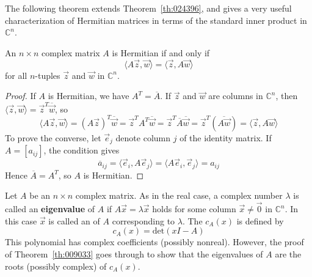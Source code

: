 \documentclass{ximera}
\begin{document}
The following theorem extends Theorem~\ref{th:024396}, and gives a very useful characterization of Hermitian matrices in terms of the standard inner product in $\mathbb{C}^n$.


\begin{theorem}\label{th:025697}
An $n \times n$ complex matrix $A$ is Hermitian if and only if
\begin{equation*}
\langle A\vec{z}, \vec{w} \rangle = \langle \vec{z}, A\vec{w} \rangle
\end{equation*}
for all $n$-tuples $\vec{z}$ and $\vec{w}$ in $\mathbb{C}^n$.
\end{theorem}

\begin{proof}
If $A$ is Hermitian, we have $A^T = \overline{A}$. If $\vec{z}$ and $\vec{w}$ are columns in $\mathbb{C}^n$, then $\langle \vec{z}, \vec{w} \rangle = \vec{z}^T\overline{\vec{w}}$, so
\begin{equation*}
\langle A\vec{z}, \vec{w} \rangle =(A\vec{z})^T\overline{\vec{w}} = \vec{z}^TA^T\overline{\vec{w}} = \vec{z}^T\overline{A}\overline{\vec{w}} = \vec{z}^T(\overline{A\vec{w}}) = \langle \vec{z}, A\vec{w} \rangle
\end{equation*}
To prove the converse, let $\vec{e}_{j}$ denote column $j$ of the identity matrix. If $A = \left[ a_{ij} \right]$, the condition gives
\begin{equation*}
\overline{a}_{ij} = \langle \vec{e}_{i}, A\vec{e}_{j} \rangle = \langle A\vec{e}_{i}, \vec{e}_{j} \rangle = {a}_{ij}
\end{equation*}
Hence $\overline{A} = A^T$, so $A$ is Hermitian.
\end{proof}

Let $A$ be an $n \times n$ complex matrix. As in the real case, a complex number $\lambda$ is called an \textbf{eigenvalue} of $A$ if $A\vec{x} = \lambda \vec{x}$ holds for some column $\vec{x} \neq \vec{0}$ in $\mathbb{C}^n$. In this case $\vec{x}$ is called an  of $A$ corresponding to $\lambda$. The  $c_{A}(x)$ is defined by
\begin{equation*}
c_{A}(x) = \mbox{det}(xI - A)
\end{equation*}
This polynomial has complex coefficients (possibly nonreal). However, the proof of Theorem~\ref{th:009033} goes through to show that the eigenvalues of $A$ are the roots (possibly complex) of $c_{A}(x)$.
\end{document}
